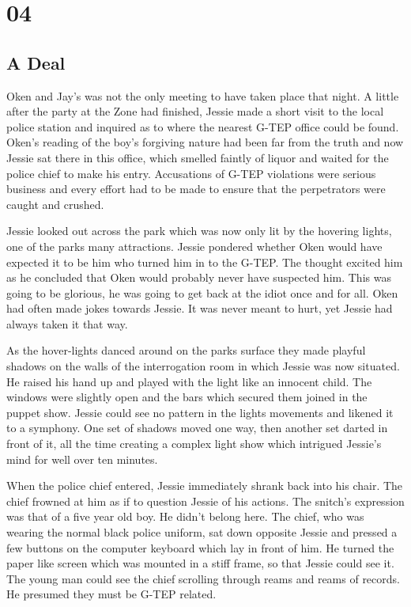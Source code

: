 \chapter{04}
\section{A Deal}


Oken and Jay's was not the only meeting to have taken place that night.  A little after the party at the Zone had finished, Jessie made a short visit to the local police station and inquired as to where the nearest G-TEP office could be found.  Oken's reading of the boy's forgiving nature had been far from the truth and now Jessie sat there in this office, which smelled faintly of liquor and waited for the police chief to make his entry.  Accusations of G-TEP violations were serious business and every effort had to be made to ensure that the perpetrators were caught and crushed.  

Jessie looked out across the park which was now only lit by the hovering lights, one of the parks many attractions.  Jessie pondered whether Oken would have expected it to be him who turned him in to the G-TEP.  The thought excited him as he concluded that Oken would probably never have suspected him.  This was going to be glorious, he was going to get back at the idiot once and for all.  Oken had often made jokes towards Jessie.  It was never meant to hurt, yet Jessie had always taken it that way.

As the hover-lights danced around on the parks surface they made playful shadows on the walls of the interrogation room in which Jessie was now situated.  He raised his hand up and played with the light like an innocent child.  The windows were slightly open and the bars which secured them joined in the puppet show.  Jessie could see no pattern in the lights movements and likened it to a symphony.  One set of shadows moved one way, then another set darted in front of it, all the time creating a complex light show which intrigued Jessie's mind for well over ten minutes.

When the police chief entered, Jessie immediately shrank back into his chair.  The chief frowned at him as if to question Jessie of his actions.  The snitch's expression was that of a five year old boy.  He didn't belong here.  The chief, who was wearing the normal black police uniform, sat down opposite Jessie and pressed a few buttons on the computer keyboard which lay in front of him.   He turned the paper like screen which was mounted in a stiff frame, so that Jessie could see it.  The young man could see the chief scrolling through reams and reams of records.  He presumed they must be G-TEP related.

